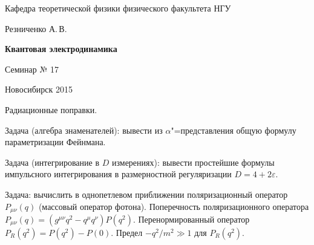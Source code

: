 \documentclass[12pt,pagesize,paper=landscape,paper=192mm:108mm]{scrbook}
\renewcommand{\epsilon}{\varepsilon}
\begin{document}
\begin{titlepage}
\begin{center}
    Кафедра теоретической физики физического факультета НГУ
    \medskip

    \Large
    Резниченко А.\,В.
    \bigskip

    \huge
    \textbf{Квантовая электродинамика}
    \bigskip

    \Large
    Семинар № 17
    \vfill

    \normalsize
    \vfill

    \normalsize \ccbysa\hspace{0.5em}  Новосибирск 2015
  \end{center}
\end{titlepage}
\newpage

\vspace*{-1em}
\begin{center}
\vfill
  \begin{minipage}{0.65\linewidth}

    Радиационные поправки.
    \smallskip

    Задача (алгебра знаменателей): вывести из $\alpha$"=представления общую
    формулу параметризации Фейнмана.
    \smallskip

    Задача (интегрирование в $D$ измерениях): вывести простейшие формулы
    импульсного интегрирования в размерностной регуляризации $D=4+2\epsilon$.
    \smallskip

    Задача: вычислить в однопетлевом приближении поляризационный
    оператор $P_{\mu\nu} (q)$ (массовый оператор фотона). Поперечность
    поляризационного оператора $P_{\mu\nu}(q)=
    (g^{\mu\nu}q^2-q^{\mu}q^{\nu})P(q^2)$. Перенормированный оператор
    $P_R(q^2)=P(q^2)-P(0)$. Предел $-q^2/m^2\gg 1$ для $P_R(q^2)$.

  \end{minipage}
  \vfill

\end{center}
\end{document}
